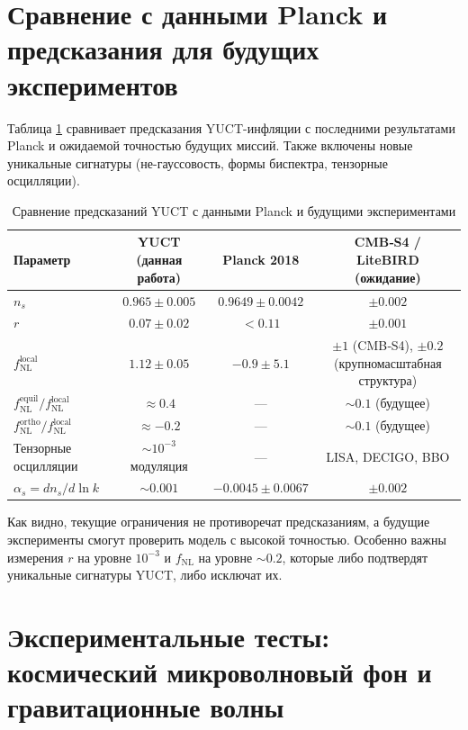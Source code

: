 \documentclass[11pt,a4paper]{article}
\newcommand{\rs}{r}
\begin{document}
	\section{Сравнение с данными Planck и предсказания для будущих экспериментов}
	\label{sec:comparison}
	
	Таблица \ref{tab:comparison} сравнивает предсказания YUCT-инфляции с последними результатами Planck и ожидаемой точностью будущих миссий. Также включены новые уникальные сигнатуры (не-гауссовость, формы биспектра, тензорные осцилляции).
	
	\begin{table}[htbp]
		\small
		\centering
		\caption{Сравнение предсказаний YUCT с данными Planck и будущими экспериментами}
		\label{tab:comparison}
		\begin{tabular}{lccc}
			\toprule
			\textbf{Параметр} & \textbf{YUCT (данная работа)} & \textbf{Planck 2018} & \textbf{CMB‑S4 / LiteBIRD (ожидание)} \\
			\midrule
			\(n_s\) & \(0.965 \pm 0.005\) & \(0.9649 \pm 0.0042\) & \(\pm 0.002\) \\
			\(\rs\) & \(0.07 \pm 0.02\) & \(<0.11\) & \(\pm 0.001\) \\
			\(f_{\mathrm{NL}}^{\mathrm{local}}\) & \(1.12 \pm 0.05\) & \(-0.9 \pm 5.1\) & \(\pm 1\) (CMB‑S4), \(\pm 0.2\) (крупномасштабная структура) \\
			\(f_{\mathrm{NL}}^{\mathrm{equil}} / f_{\mathrm{NL}}^{\mathrm{local}}\) & \(\approx 0.4\) & — & \(\sim 0.1\) (будущее) \\
			\(f_{\mathrm{NL}}^{\mathrm{ortho}} / f_{\mathrm{NL}}^{\mathrm{local}}\) & \(\approx -0.2\) & — & \(\sim 0.1\) (будущее) \\
			Тензорные осцилляции & \( \sim 10^{-3}\) модуляция & — & LISA, DECIGO, BBO \\
			\(\alpha_s = dn_s/d\ln k\) & \(\sim 0.001\) & \(-0.0045 \pm 0.0067\) & \(\pm 0.002\) \\
			\bottomrule
		\end{tabular}
	\end{table}
	
	Как видно, текущие ограничения не противоречат предсказаниям, а будущие эксперименты смогут проверить модель с высокой точностью. Особенно важны измерения \(r\) на уровне \(10^{-3}\) и \(f_{\text{NL}}\) на уровне \(\sim 0.2\), которые либо подтвердят уникальные сигнатуры YUCT, либо исключат их.
	
	\section{Экспериментальные тесты: космический микроволновый фон и гравитационные волны}
	\label{sec:tests}
	
\end{document}
